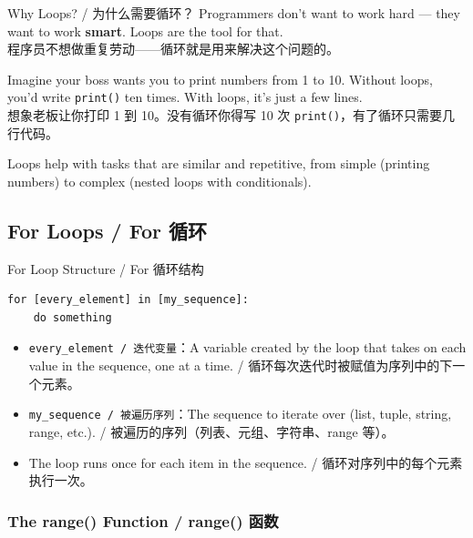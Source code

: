 \documentclass[11pt,a4paper]{report}
\let\oldtexttt\texttt
\renewcommand{\texttt}[1]{\textcolor{mainblue}{\oldtexttt{#1}}}
\begin{document}
\begin{concept}{Why Loops? / 为什么需要循环？}
    Programmers don't want to work hard — they want to work \textbf{smart}. Loops are the tool for that. \\
    程序员不想做重复劳动——循环就是用来解决这个问题的。

    Imagine your boss wants you to print numbers from 1 to 10. Without loops, you'd write \texttt{print()} ten times. With loops, it's just a few lines. \\
    想象老板让你打印 1 到 10。没有循环你得写 10 次 \texttt{print()}，有了循环只需要几行代码。

    Loops help with tasks that are similar and repetitive, from simple (printing numbers) to complex (nested loops with conditionals).
\end{concept}

\subsection{For Loops / For 循环}

\begin{concept}{For Loop Structure / For 循环结构}
    \begin{lstlisting}
for [every_element] in [my_sequence]:
    do something
    \end{lstlisting}
    \begin{itemize}[itemsep=0.3em]
        \item \texttt{every\_element / 迭代变量}：A variable created by the loop that takes on each value in the sequence, one at a time. / 循环每次迭代时被赋值为序列中的下一个元素。
        \item \texttt{my\_sequence / 被遍历序列}：The sequence to iterate over (list, tuple, string, range, etc.). / 被遍历的序列（列表、元组、字符串、range 等）。
        \item The loop runs once for each item in the sequence. / 循环对序列中的每个元素执行一次。
    \end{itemize}
\end{concept}

\subsubsection{The range() Function / range() 函数}
\end{document}

